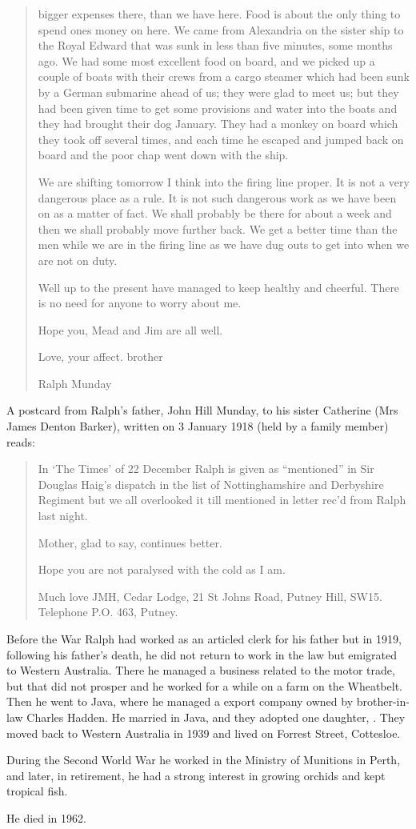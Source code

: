\begin{quotation}
bigger expenses there, than we have here. Food is about the only thing to spend ones money on here. We came from Alexandria on the sister ship to the Royal Edward that was sunk in less than five minutes, some months ago. We had some most excellent food on board, and we picked up a couple of boats with their crews from a cargo steamer which had been sunk by a German submarine ahead of us; they were glad to meet us; but they had been given time to get some provisions and water into the boats and they had brought their dog January. They had a monkey on board which they took off several times, and each time he escaped and jumped back on board and the poor chap went down with the ship.

We are shifting tomorrow I think into the firing line proper. It is not a very dangerous place as a rule. It is not such dangerous work as we have been on as a matter of fact. We shall probably be there for about a week and then we shall probably move further back. We get a better time than the men while we are in the firing line as we have dug outs to get into when we are not on duty.

Well up to the present have managed to keep healthy and cheerful. There is no need for anyone to worry about me.

Hope you, Mead and Jim are all well.

Love, your affect. brother

Ralph Munday
\end{quotation}

A postcard from Ralph's father, John Hill Munday, to his sister Catherine (Mrs James Denton Barker), written on 3 January 1918 (held by a family member) reads:

\begin{quotation}
In `The Times' of 22 December Ralph is given as ``mentioned'' in Sir Douglas Haig's dispatch in the list of Nottinghamshire and Derbyshire Regiment but we all overlooked it till mentioned in letter rec'd from Ralph last night.

Mother, glad to say, continues better.

Hope you are not paralysed with the cold as I am.

Much love JMH, Cedar Lodge, 21 St Johns Road, Putney Hill, SW15.
Telephone P.O. 463, Putney.
\end{quotation}

Before the War Ralph had worked as an articled clerk for his father but in 1919, following his father's death, he did not return to work in the law but emigrated to Western Australia.  There he managed a business related to the motor trade, but that did not prosper and he worked for a while on a farm on the Wheatbelt. Then he went to Java,  where he managed a export company owned by brother-in-law Charles Hadden.  He married  in Java,\cite{LadiesSection} and they adopted one daughter, .
They moved back to Western Australia in 1939 and lived on Forrest Street, Cottesloe. 

During the Second World War he worked in the Ministry of Munitions in Perth, and later, in retirement, he had a strong interest in growing orchids and kept tropical fish. 

He died in 1962.\cite{RalphMundayBMD}
